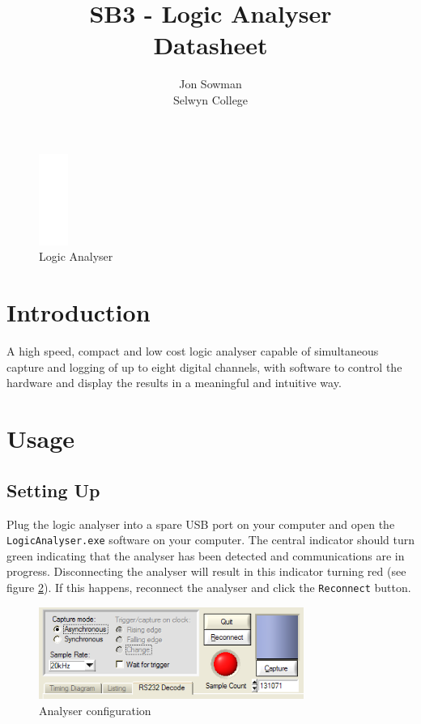 \documentclass[11pt,twocolumn]{article}
\title{SB3 - Logic Analyser\\Datasheet}
\author{Jon Sowman\\Selwyn College}
\begin{document}
    \maketitle
	
    \begin{figure}
    \centering
    \includegraphics[height=3cm]{blank}
    \caption{Logic Analyser}
    \label{fig:la}
    \end{figure}

\section{Introduction}
    A high speed, compact and low cost logic analyser capable of simultaneous capture and
    logging of up to eight digital channels, with software to control the
    hardware and display the results in a meaningful and intuitive way.

\section{Usage}
\subsection{Setting Up}
    Plug the logic analyser into a spare USB port on your computer and open the
    \texttt{LogicAnalyser.exe} software on your computer. The central indicator
    should turn green indicating that the analyser has been detected and
    communications are in progress. Disconnecting the analyser will result in
    this indicator turning red (see figure \ref{fig:ui-config}). 
    If this happens, reconnect the analyser and
    click the \texttt{Reconnect} button.

    \begin{figure}
    \centering
    \includegraphics[height=3cm]{ui-config}
    \caption{Analyser configuration}
    \label{fig:ui-config}
    \end{figure}
\end{document}

